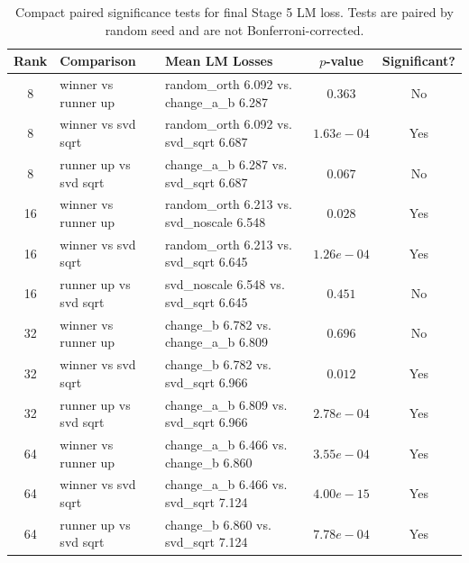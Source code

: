\begin{table}[h!]
\centering
\small
\begin{tabular}{c l l c c}
\hline
Rank & Comparison & Mean LM Losses & $p$-value & Significant? \\
\hline
8 & winner vs runner up & random_orth 6.092 vs. change_a_b 6.287 & $0.363$ & No \\
8 & winner vs svd sqrt & random_orth 6.092 vs. svd_sqrt 6.687 & $1.63e-04$ & Yes \\
8 & runner up vs svd sqrt & change_a_b 6.287 vs. svd_sqrt 6.687 & $0.067$ & No \\
16 & winner vs runner up & random_orth 6.213 vs. svd_noscale 6.548 & $0.028$ & Yes \\
16 & winner vs svd sqrt & random_orth 6.213 vs. svd_sqrt 6.645 & $1.26e-04$ & Yes \\
16 & runner up vs svd sqrt & svd_noscale 6.548 vs. svd_sqrt 6.645 & $0.451$ & No \\
32 & winner vs runner up & change_b 6.782 vs. change_a_b 6.809 & $0.696$ & No \\
32 & winner vs svd sqrt & change_b 6.782 vs. svd_sqrt 6.966 & $0.012$ & Yes \\
32 & runner up vs svd sqrt & change_a_b 6.809 vs. svd_sqrt 6.966 & $2.78e-04$ & Yes \\
64 & winner vs runner up & change_a_b 6.466 vs. change_b 6.860 & $3.55e-04$ & Yes \\
64 & winner vs svd sqrt & change_a_b 6.466 vs. svd_sqrt 7.124 & $4.00e-15$ & Yes \\
64 & runner up vs svd sqrt & change_b 6.860 vs. svd_sqrt 7.124 & $7.78e-04$ & Yes \\
\hline
\end{tabular}
\caption{Compact paired significance tests for final Stage 5 LM loss. Tests are paired by random seed and are not Bonferroni-corrected.}
\label{tab:stage5-compact-significance}
\end{table}

